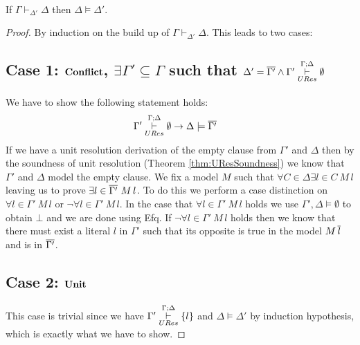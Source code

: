 \medskip
%
\begin{mytheorem}\label{thm:learnedclause} \hspace*{0pt} \\
\begin{center}If $\Gamma \vdash_{\Delta'} \Delta$  then  $\Delta \models \Delta'$.\end{center}
%
\begin{proof}
By induction on the build up of $\Gamma \vdash_{\Delta'} \Delta$. This leads to two  cases:
\subsection*{Case 1: $\mathbf{Conflict}$, $\exists \Gamma' \subseteq \Gamma$ such that $\Delta' = \overline{\Gamma'} \wedge \Gamma' \overset{\Gamma;\Delta}{\underset{URes}{\vdash}}\emptyset$}
We have to show the following statement holds:
%
\begin{align*}
\Gamma'& \overset{\Gamma;\Delta}{\underset{URes}{\vdash}} \emptyset\to \Delta \models \overline{\Gamma'}
\end{align*}
%
%
If we have a unit resolution derivation of the empty clause from $\Gamma'$ and $\Delta$ then by the soundness of unit resolution (Theorem \ref{thm:UResSoundness}) we know  that $\Gamma'$ and $\Delta$ model the empty clause.  We fix a model $M$ such that $\forall C \in \Delta \exists l \in C \ M \, l$  leaving us to prove $\exists l \in \overline{\Gamma'} \ M \, l$. To do this we perform a case distinction on $\forall l \in \Gamma' \ M \, l$ or $\neg \forall l \in \Gamma' \ M \, l$. In the case that $\forall l \in \Gamma' \ M \, l$ holds we use $\Gamma', \Delta \models \emptyset$ to obtain $\bot$ and we are done using Efq. If $\neg \forall l \in \Gamma' \ M \, l$ holds then we know that there must exist a literal $l$ in $\Gamma'$ such that its opposite is true in the model $M \, \overline{l}$ and is in $\overline{\Gamma'}$.
%

\subsection*{Case 2: $\mathbf{Unit}$}
This case is trivial since we have $\Gamma'\overset{\Gamma;\Delta}{\underset{URes}{\vdash}} \{l \}$ and  $\Delta \models \Delta'$ by induction hypothesis, which is exactly what we have to show.

\end{proof}
\end{mytheorem}
